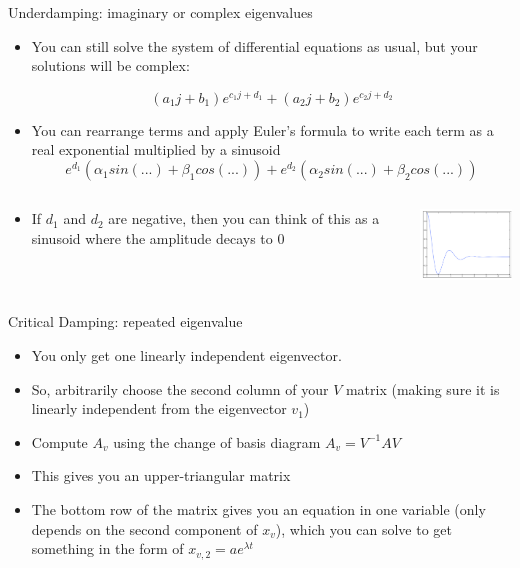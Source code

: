 	\begin{frame}{Underdamping: imaginary or complex eigenvalues}
	    \begin{itemize}
	        \item You can still solve the system of differential equations as usual, but your solutions will be complex:
            
            $$(a_1j + b_1)e^{c_1j + d_1} + (a_2j + b_2)e^{c_2j + d_2}$$
            
            \item You can rearrange terms and apply Euler’s formula to write each term as a real exponential multiplied by a sinusoid
            $$e^{d_1}(\alpha_1sin(...) + \beta_1cos(...)) + e^{d_2}(\alpha_2sin(...) + \beta_2cos(...))$$
            
            \item
            \begin{columns}[onlytextwidth,T]
            \column{\dimexpr\linewidth-40mm-5mm}
        	    If $d_1$ and $d_2$ are negative, then you can think of this as a sinusoid where the amplitude decays to 0
        	
        	\column{40mm}
        	    \includegraphics[width=40mm]{./images/eigenvalue-types-2.png}
    	    \end{columns}
	    \end{itemize}
	\end{frame}
	
	\begin{frame}{Critical Damping: repeated eigenvalue}
	    \begin{itemize}
	        \item You only get one linearly independent eigenvector. 
            
            \item So, arbitrarily choose the second column of your $V$ matrix (making sure it is linearly independent from the eigenvector $v_1$)
            
            \item Compute $A_v$ using the change of basis diagram $A_v = V^{-1}AV$
            
            \item This gives you an upper-triangular matrix
            
            \item The bottom row of the matrix gives you an equation in one variable (only depends on the second component of $x_v$), which you can solve to get something in the form of $x_{v,2} = ae^{\lambda{t}}$
	    \end{itemize}
	\end{frame}
	
